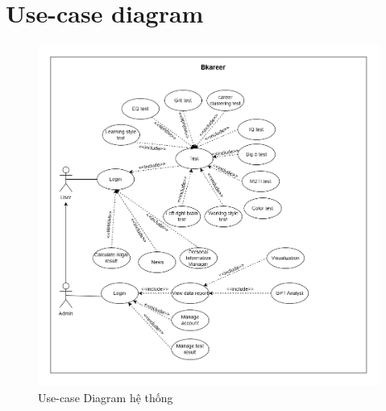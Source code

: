 \section{Use-case diagram}

\begin{figure}[H]
    \centering
    \includegraphics[width=0.5\linewidth]{images/usecase.png}
    \vspace{0.6cm}
    \caption{Use-case Diagram hệ thống}
\end{figure}

